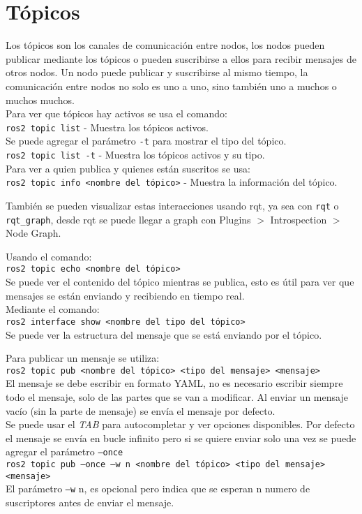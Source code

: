 \documentclass{report}
\begin{document}
\section{Tópicos}
Los tópicos son los canales de comunicación entre nodos, los nodos pueden publicar mediante los tópicos
o pueden suscribirse a ellos para recibir mensajes de otros nodos. Un nodo puede publicar y suscribirse
al mismo tiempo, la comunicación entre nodos no solo es uno a uno, sino también uno a muchos o muchos
muchos.
\\Para ver que tópicos hay activos se usa el comando:
\\\texttt{ros2 topic list} - Muestra los tópicos activos.
\\Se puede agregar el parámetro \texttt{-t} para mostrar el tipo del tópico.
\\\texttt{ros2 topic list -t} - Muestra los tópicos activos y su tipo.
\\Para ver a quien publica y quienes están suscritos se usa:
\\\texttt{ros2 topic info <nombre del tópico>} - Muestra la información del tópico.

También se pueden visualizar estas interacciones usando rqt, ya sea con \texttt{rqt} o \texttt{rqt\_graph},
desde rqt se puede llegar a graph con Plugins $>$ Introspection $>$ Node Graph.

Usando el comando:
\\\texttt{ros2 topic echo <nombre del tópico>}
\\Se puede ver el contenido del tópico mientras
se publica, esto es útil para ver que mensajes se están enviando y recibiendo en tiempo real.
\\Mediante el comando:
\\\texttt{ros2 interface show <nombre del tipo del tópico>}
\\Se puede ver la estructura del mensaje que se está enviando por el tópico.

Para publicar un mensaje se utiliza:
\\\texttt{ros2 topic pub <nombre del tópico> <tipo del mensaje> <mensaje>}
\\El mensaje se debe escribir en formato YAML, no es necesario escribir siempre todo el mensaje, solo de 
las partes que se van a modificar. Al enviar un mensaje vacío (sin la parte de mensaje) se envía el
mensaje por defecto.
\\Se puede usar el \textit{TAB} para autocompletar y ver opciones disponibles. Por defecto el mensaje
se envía en bucle infinito pero si se quiere enviar solo una vez se puede agregar el parámetro \texttt{--once}
\\\texttt{ros2 topic pub --once --w n <nombre del tópico> <tipo del mensaje> <mensaje>}
\\El parámetro \texttt{--w} n, es opcional pero indica que se esperan n numero de suscriptores antes
de enviar el mensaje.
\end{document}
